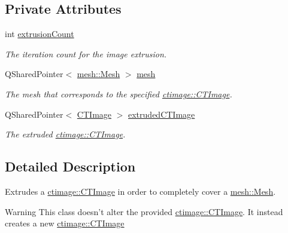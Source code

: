 \subsection*{Private Attributes}
\begin{DoxyCompactItemize}
\item 
\hypertarget{classctimage_1_1_volume_corrector_ad58e1281952791cc0508ba7e531d335a}{
int \hyperlink{classctimage_1_1_volume_corrector_ad58e1281952791cc0508ba7e531d335a}{extrusionCount}}
\label{classctimage_1_1_volume_corrector_ad58e1281952791cc0508ba7e531d335a}

\begin{DoxyCompactList}\small\item\em The iteration count for the image extrusion. \item\end{DoxyCompactList}\item 
\hypertarget{classctimage_1_1_volume_corrector_a619b8444da48d717b5314a04b39fc6cd}{
QSharedPointer$<$ \hyperlink{classmesh_1_1_mesh}{mesh::Mesh} $>$ \hyperlink{classctimage_1_1_volume_corrector_a619b8444da48d717b5314a04b39fc6cd}{mesh}}
\label{classctimage_1_1_volume_corrector_a619b8444da48d717b5314a04b39fc6cd}

\begin{DoxyCompactList}\small\item\em The mesh that corresponds to the specified \hyperlink{classctimage_1_1_c_t_image}{ctimage::CTImage}. \item\end{DoxyCompactList}\item 
\hypertarget{classctimage_1_1_volume_corrector_aeba98b07c027b1d9c1e8d6219aaee468}{
QSharedPointer$<$ \hyperlink{classctimage_1_1_c_t_image}{CTImage} $>$ \hyperlink{classctimage_1_1_volume_corrector_aeba98b07c027b1d9c1e8d6219aaee468}{extrudedCTImage}}
\label{classctimage_1_1_volume_corrector_aeba98b07c027b1d9c1e8d6219aaee468}

\begin{DoxyCompactList}\small\item\em The extruded \hyperlink{classctimage_1_1_c_t_image}{ctimage::CTImage}. \item\end{DoxyCompactList}\end{DoxyCompactItemize}


\subsection{Detailed Description}
Extrudes a \hyperlink{classctimage_1_1_c_t_image}{ctimage::CTImage} in order to completely cover a \hyperlink{classmesh_1_1_mesh}{mesh::Mesh}. \begin{DoxyWarning}{Warning}
This class doesn't alter the provided \hyperlink{classctimage_1_1_c_t_image}{ctimage::CTImage}. It instead creates a new \hyperlink{classctimage_1_1_c_t_image}{ctimage::CTImage} 
\end{DoxyWarning}



